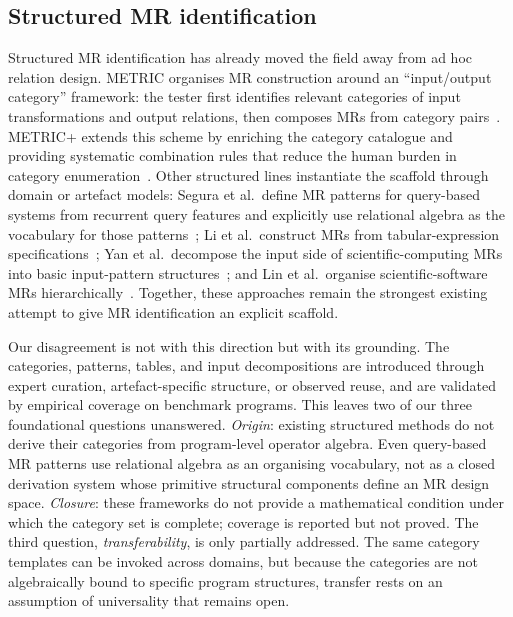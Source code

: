 \documentclass[acmsmall,screen,review]{acmart}
\begin{document}
\subsection{Structured MR identification}

Structured MR identification has already moved the field away from ad hoc relation design. METRIC organises MR construction around an ``input/output category'' framework: the tester first identifies relevant categories of input transformations and output relations, then composes MRs from category pairs~\cite{ChenMETRIC2016}. METRIC+ extends this scheme by enriching the category catalogue and providing systematic combination rules that reduce the human burden in category enumeration~\cite{SunMETRICplus2021}. Other structured lines instantiate the scaffold through domain or artefact models: Segura et al.\ define MR patterns for query-based systems from recurrent query features and explicitly use relational algebra as the vocabulary for those patterns~\cite{Segura2019QBSMRPatterns}; Li et al.\ construct MRs from tabular-expression specifications~\cite{Li2020TabularMR}; Yan et al.\ decompose the input side of scientific-computing MRs into basic input-pattern structures~\cite{Yan2022InputPattern}; and Lin et al.\ organise scientific-software MRs hierarchically~\cite{Lin2018HierarchicalMR}. Together, these approaches remain the strongest existing attempt to give MR identification an explicit scaffold.

Our disagreement is not with this direction but with its grounding. The categories, patterns, tables, and input decompositions are introduced through expert curation, artefact-specific structure, or observed reuse, and are validated by empirical coverage on benchmark programs. This leaves two of our three foundational questions unanswered. \emph{Origin}: existing structured methods do not derive their categories from program-level operator algebra. Even query-based MR patterns use relational algebra as an organising vocabulary, not as a closed derivation system whose primitive structural components define an MR design space. \emph{Closure}: these frameworks do not provide a mathematical condition under which the category set is complete; coverage is reported but not proved. The third question, \emph{transferability}, is only partially addressed. The same category templates can be invoked across domains, but because the categories are not algebraically bound to specific program structures, transfer rests on an assumption of universality that remains open.
\end{document}
